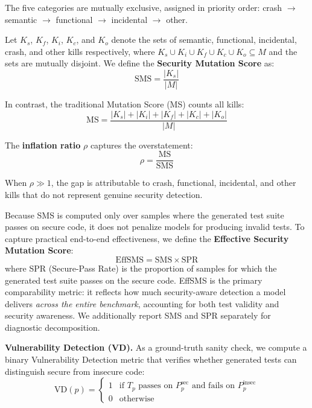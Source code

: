 \documentclass[sigconf,anonymous,review]{acmart}
\begin{document}
\noindent The five categories are mutually exclusive, assigned in priority order: crash $\rightarrow$ semantic $\rightarrow$ functional $\rightarrow$ incidental $\rightarrow$ other.

\noindent Let $K_s$, $K_f$, $K_i$, $K_c$, and $K_o$ denote the sets of semantic, functional, incidental, crash, and other kills respectively, where $K_s \cup K_i \cup K_f \cup K_c \cup K_o \subseteq M$ and the sets are mutually disjoint. We define the \textbf{Security Mutation Score} as:
\begin{equation}
    \text{SMS} = \frac{|K_s|}{|M|}
\end{equation}

\noindent In contrast, the traditional Mutation Score (MS) counts all kills:
\begin{equation}
    \text{MS} = \frac{|K_s| + |K_i| + |K_f| + |K_c| + |K_o|}{|M|}
\end{equation}

\noindent The \textbf{inflation ratio} $\rho$ captures the overstatement:
\begin{equation}
    \rho = \frac{\text{MS}}{\text{SMS}}
\end{equation}

\noindent When $\rho \gg 1$, the gap is attributable to crash, functional, incidental, and other kills that do not represent genuine security detection.

Because SMS is computed only over samples where the generated test suite passes on secure code, it does not penalize models for producing invalid tests. To capture practical end-to-end effectiveness, we define the \textbf{Effective Security Mutation Score}:
\begin{equation}
    \text{EffSMS} = \text{SMS} \times \text{SPR}
\end{equation}
\noindent where SPR (Secure-Pass Rate) is the proportion of samples for which the generated test suite passes on the secure code. EffSMS is the primary comparability metric: it reflects how much security-aware detection a model delivers \emph{across the entire benchmark}, accounting for both test validity and security awareness. We additionally report SMS and SPR separately for diagnostic decomposition.

\textbf{Vulnerability Detection (VD).} As a ground-truth sanity check, we compute a binary Vulnerability Detection metric that verifies whether generated tests can distinguish secure from insecure code:
\begin{equation}
    \text{VD}(p) = \begin{cases} 1 & \text{if } T_p \text{ passes on } P_p^{\text{sec}} \text{ and fails on } P_p^{\text{insec}} \\ 0 & \text{otherwise} \end{cases}
\end{equation}
\end{document}
